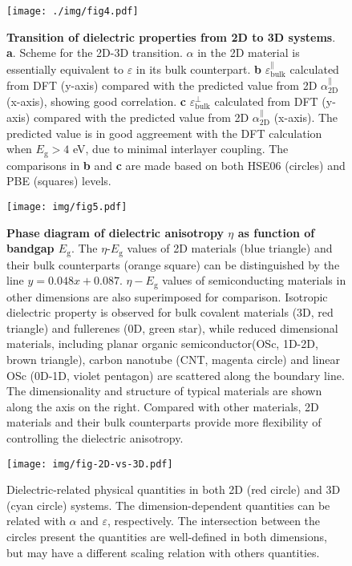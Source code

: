 \documentclass[journal=ancac3,manuscript=article,email=true,hyperref=true,keywords=false]{achemso}
\begin{document}
\begin{figure}[H]
\centering
\texttt{[image: ./img/fig4.pdf]}
\caption{\label{fig-4} \textbf{Transition of dielectric properties
    from 2D to 3D systems}. \textbf{a}. Scheme for the 2D-3D
  transition. $\alpha$ in the 2D material is essentially equivalent to
  $\varepsilon$ in its bulk counterpart. \textbf{b}
  $\varepsilon_{\mathrm{bulk}}^{\parallel}$ calculated from DFT
  (y-axis) compared with the predicted value from 2D
  $\alpha_{\mathrm{2D}}^{\parallel}$ (x-axis), showing good correlation. \textbf{c}
  $\varepsilon_{\mathrm{bulk}}^{\perp}$ calculated from DFT (y-axis)
  compared with the predicted value from 2D $\alpha_{\mathrm{2D}}^{\parallel}$
  (x-axis). The predicted value is in good aggreement with the DFT
  calculation when $E_{\mathrm{g}}>4$ eV, due to minimal interlayer
  coupling. The comparisons in \textbf{b} and \textbf{c} are made
  based on both HSE06 (circles) and PBE (squares) levels.}
\end{figure}

\begin{figure}[H]
  \centering
  \texttt{[image: img/fig5.pdf]}
  \caption{\textbf{Phase diagram of dielectric anisotropy $\eta$ as
      function of bandgap $E_{\mathrm{g}}$}. The
    $\eta$-$E_{\mathrm{g}}$ values of 2D materials (blue triangle) and
    their bulk counterparts (orange square) can be distinguished by
    the line $y=0.048x+0.087$. $\eta-E_{\mathrm{g}}$ values of
    semiconducting materials in other dimensions are also superimposed
    for comparison. Isotropic dielectric property is observed for bulk
    covalent materials (3D, red triangle) and fullerenes (0D, green
    star), while reduced dimensional materials, including planar
    organic semiconductor(OSc, 1D-2D, brown triangle), carbon nanotube
    (CNT, magenta circle) and linear OSc (0D-1D, violet pentagon) are
    scattered along the boundary line. The dimensionality and
    structure of typical materials are shown along the axis on the
    right. Compared with other materials, 2D materials and their bulk
    counterparts provide more flexibility of controlling the
    dielectric anisotropy.}
  \label{fig:aniso}
\end{figure}

\begin{figure}[htbp]
\centering
\texttt{[image: img/fig-2D-vs-3D.pdf]}
\caption{\label{fig-2D-3D} Dielectric-related physical quantities in
  both 2D (red circle) and 3D (cyan circle) systems. The
  dimension-dependent quantities can be related with $\alpha$ and
  $\varepsilon$, respectively. The intersection between the circles
  present the quantities are well-defined in both dimensions, but may have a
  different scaling relation with others quantities.}
\end{figure}
\end{document}

